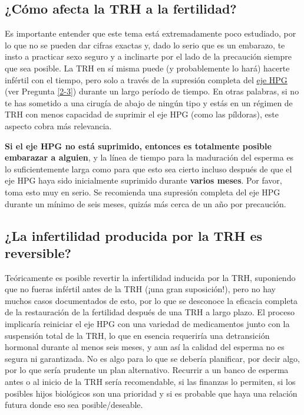 \documentclass{article}
\begin{document}
\subsection{¿Cómo afecta la TRH a la fertilidad?}\label{11-42}

Es importante entender que este tema está extremadamente poco estudiado, por lo que no se pueden dar cifras exactas y, dado lo serio que es un embarazo, te insto a practicar sexo seguro y a inclinarte por el lado de la precaución siempre que sea posible. La TRH en sí misma puede (y probablemente lo hará) hacerte infértil con el tiempo, pero solo a través de la supresión completa del \href{https://en.wikipedia.org/wiki/Hypothalamic-pituitary-gonadal_axis}{eje HPG} (ver Pregunta \ref{2-3}) durante un largo período de tiempo. En otras palabras, si no te has sometido a una cirugía de abajo de ningún tipo y estás en un régimen de TRH con menos capacidad de suprimir el eje HPG (como las píldoras), este aspecto cobra más relevancia.

\textbf{Si el eje HPG no está suprimido, entonces es totalmente posible embarazar a alguien}, y la línea de tiempo para la maduración del esperma es lo suficientemente larga como para que esto sea cierto incluso después de que el eje HPG haya sido inicialmente suprimido durante \textbf{varios meses}. Por favor, toma esto muy en serio. Se recomienda una supresión completa del eje HPG durante un mínimo de seis meses, quizás más cerca de un año por precaución.

\subsection{¿La infertilidad producida por la TRH es reversible?}\label{11-43}

Teóricamente es posible revertir la infertilidad inducida por la TRH, suponiendo que no fueras infértil antes de la TRH (¡una gran suposición!), pero no hay muchos casos documentados de esto, por lo que se desconoce la eficacia completa de la restauración de la fertilidad después de una TRH a largo plazo. El proceso implicaría reiniciar el eje HPG con una variedad de medicamentos junto con la suspensión total de la TRH, lo que en esencia requeriría una detransición hormonal durante al menos seis meses, y aun así la calidad del esperma no es segura ni garantizada. No es algo para lo que se debería planificar, por decir algo, por lo que sería prudente un plan alternativo. Recurrir a un banco de esperma antes o al inicio de la TRH sería recomendable, si las finanzas lo permiten, si los posibles hijos biológicos son una prioridad y si es probable que haya una relación futura donde eso sea posible/deseable.
\end{document}
